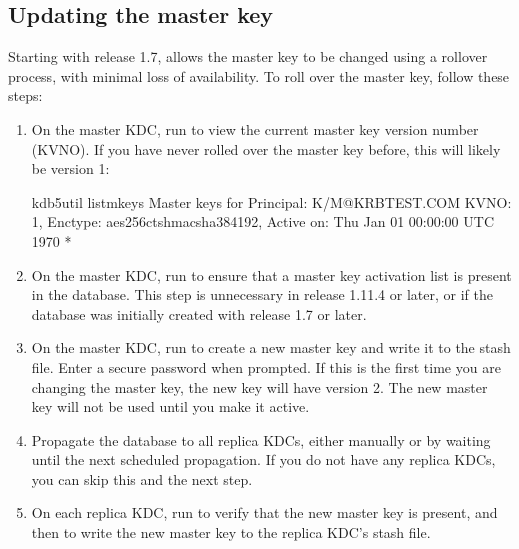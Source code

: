 \documentclass[letterpaper,10pt,english]{sphinxmanual}
\begin{document}
\subsection{Updating the master key}
\label{\detokenize{admin/database:updating-the-master-key}}
Starting with release 1.7, {\hyperref[\detokenize{admin/admin_commands/kdb5_util:kdb5-util-8}]{}} allows the master key
to be changed using a rollover process, with minimal loss of
availability.  To roll over the master key, follow these steps:
\begin{enumerate}
\item {} 
On the master KDC, run  to view the current
master key version number (KVNO).  If you have never rolled over
the master key before, this will likely be version 1:

%
\begin{sphinxVerbatim}[commandchars=\\\{\}]
\PYGZdl{} kdb5\PYGZus{}util list\PYGZus{}mkeys
Master keys for Principal: K/M@KRBTEST.COM
KVNO: 1, Enctype: aes256\PYGZhy{}cts\PYGZhy{}hmac\PYGZhy{}sha384\PYGZhy{}192, Active on: Thu Jan 01 00:00:00 UTC 1970 *
\end{sphinxVerbatim}

\item {} 
On the master KDC, run  to ensure that a
master key activation list is present in the database.  This step
is unnecessary in release 1.11.4 or later, or if the database was
initially created with release 1.7 or later.

\item {} 
On the master KDC, run  to create a new
master key and write it to the stash file.  Enter a secure password
when prompted.  If this is the first time you are changing the
master key, the new key will have version 2.  The new master key
will not be used until you make it active.

\item {} 
Propagate the database to all replica KDCs, either manually or by
waiting until the next scheduled propagation.  If you do not have
any replica KDCs, you can skip this and the next step.

\item {} 
On each replica KDC, run  to verify that
the new master key is present, and then  to
write the new master key to the replica KDC’s stash file.


\end{enumerate}
\end{document}
